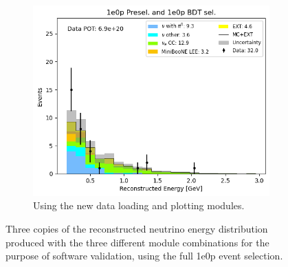 \begin{figure}[H]
    \begin{subfigure}[t]{0.31\linewidth}
        \includegraphics[width=\linewidth]{technote/EventSelections/Figures/Run123_1e0p_RecoEnergy_Alex.png}
        \caption{Using the new data loading and plotting modules.}
    \end{subfigure}%
    \caption{Three copies of the reconstructed neutrino energy distribution produced with the three different module combinations for the purpose of software validation, using the full 1e0p event selection.}
    \label{fig:distvalidation_1e0p}
\end{figure}

